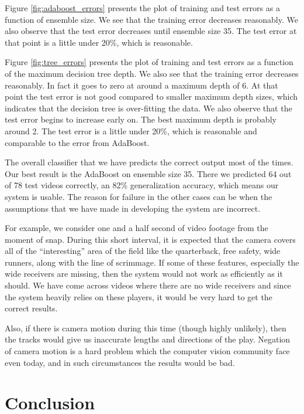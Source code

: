 \documentclass{article} %
\begin{document}
Figure \ref{fig:adaboost_errors} presents the plot of training and test errors as a function of ensemble size. We see that the training error decreases reasonably. We also observe that the test error decreases until ensemble size 35. The test error at that point is a little under 20\%, which is reasonable.

Figure \ref{fig:tree_errors} presents the plot of training and test errors as a function of the maximum decision tree depth. We also see that the training error decreases reasonably. In fact it goes to zero at around a maximum depth of 6. At that point the test error is not good compared to smaller maximum depth sizes, which indicates that the decision tree is over-fitting the data. We also observe that the test error begins to increase early on. The best maximum depth is probably around 2. The test error is a little under 20\%, which is reasonable and comparable to the error from AdaBoost.

The overall classifier that we have predicts the correct output most of the times. Our best result is the AdaBoost on ensemble size 35. There we predicted 64 out of 78 test videos correctly, an 82\% generalization accuracy, which means our system is usable. The reason for failure in the other cases can be when the assumptions that we have made in developing the system are incorrect.

For example, we consider one and a half second of video footage from the moment of snap. During this short interval, it is expected that the camera covers all of the ``interesting'' area of the field like the quarterback, free safety, wide runners, along with the line of scrimmage. If some of these features, especially the wide receivers are missing, then the system would not work as efficiently as it should. We have come across videos where there are no wide receivers and since the system heavily relies on these players, it would be very hard to get the correct results.

Also, if there is camera motion during this time (though highly unlikely), then the tracks would give us inaccurate lengths and directions of the play. Negation of camera motion is a hard problem which the computer vision community face even today, and in such circumstances the results would be bad.

\section{Conclusion}
\end{document}
